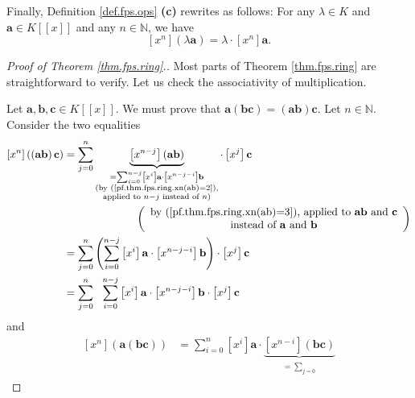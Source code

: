 Finally, Definition \ref{def.fps.ops} \textbf{(c)} rewrites as follows: For
any $\lambda\in K$ and $\mathbf{a}\in K\left[  \left[  x\right]  \right]  $
and any $n\in\mathbb{N}$, we have%
\begin{equation}
\left[  x^{n}\right]  \left(  \lambda\mathbf{a}\right)  =\lambda\cdot\left[
x^{n}\right]  \mathbf{a}. \label{pf.thm.fps.ring.xn(la)=}%
\end{equation}


\begin{proof}
[Proof of Theorem \ref{thm.fps.ring}.]Most parts of Theorem \ref{thm.fps.ring}
are straightforward to verify. Let us check the associativity of multiplication.

Let $\mathbf{a},\mathbf{b},\mathbf{c}\in K\left[  \left[  x\right]  \right]
$. We must prove that $\mathbf{a}\left(  \mathbf{bc}\right)  =\left(
\mathbf{ab}\right)  \mathbf{c}$. Let $n\in\mathbb{N}$. Consider the two
equalities%
\begin{align*}
\left[  x^{n}\right]  \left(  \left(  \mathbf{ab}\right)  \mathbf{c}\right)
&  =\sum_{j=0}^{n}\underbrace{\left[  x^{n-j}\right]  \left(  \mathbf{ab}%
\right)  }_{\substack{=\sum_{i=0}^{n-j}\left[  x^{i}\right]  \mathbf{a}%
\cdot\left[  x^{n-j-i}\right]  \mathbf{b}\\\text{(by
(\ref{pf.thm.fps.ring.xn(ab)=2}),}\\\text{applied to }n-j\text{ instead of
}n\text{)}}}\cdot\left[  x^{j}\right]  \mathbf{c}\\
&  \ \ \ \ \ \ \ \ \ \ \ \ \ \ \ \ \ \ \ \ \left(
\begin{array}
[c]{c}%
\text{by (\ref{pf.thm.fps.ring.xn(ab)=3}), applied to }\mathbf{ab}\text{ and
}\mathbf{c}\\
\text{instead of }\mathbf{a}\text{ and }\mathbf{b}%
\end{array}
\right) \\
&  =\sum_{j=0}^{n}\left(  \sum_{i=0}^{n-j}\left[  x^{i}\right]  \mathbf{a}%
\cdot\left[  x^{n-j-i}\right]  \mathbf{b}\right)  \cdot\left[  x^{j}\right]
\mathbf{c}\\
&  =\sum_{j=0}^{n}\ \ \sum_{i=0}^{n-j}\left[  x^{i}\right]  \mathbf{a}%
\cdot\left[  x^{n-j-i}\right]  \mathbf{b}\cdot\left[  x^{j}\right]  \mathbf{c}%
\end{align*}
and%
\begin{align*}
\left[  x^{n}\right]  \left(  \mathbf{a}\left(  \mathbf{bc}\right)  \right)
&  =\sum_{i=0}^{n}\left[  x^{i}\right]  \mathbf{a}\cdot\underbrace{\left[
x^{n-i}\right]  \left(  \mathbf{bc}\right)  }_{\substack{=\sum_{j=0}%
}}
\end{align*}
\end{proof}
